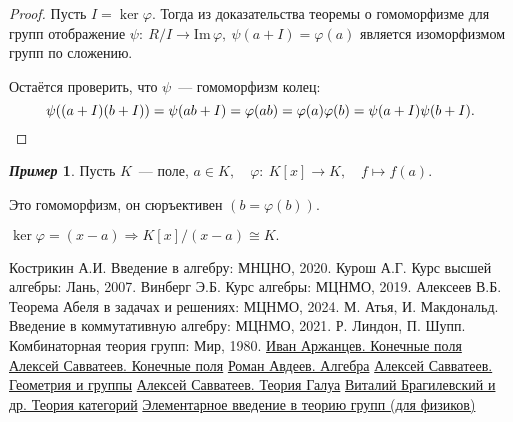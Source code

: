 \documentclass[a4paper, 14pt]{extarticle}
\newcommand{\n}{\par}
\newcommand{\im}{\mathrm{Im} \,}
\renewcommand{\phi}{\varphi}
\theoremstyle{definition}
\newtheorem*{exmpl*}{\textit{Пример}}
\theoremstyle{plain}
\numberwithin{theorem}{section}
\numberwithin{definition}{section}
\numberwithin{statement}{section}
\numberwithin{lemma}{section}
\numberwithin{consequence}{section}
\begin{document}
	\begin{proof}
		Пусть ${I = \ker \phi.}$ Тогда из доказательства теоремы о гомоморфизме для групп отображение ${\psi{:} \ R/I \rightarrow \im \phi, \ \psi(a + I) = \phi(a)}$ является изоморфизмом групп по сложению.\n
		Остаётся проверить, что $\psi$~--- гомоморфизм колец:
		\begin{equation*}
			\psi((a + I)(b + I)) = \psi(ab + I) = \phi(ab) = \phi(a)\phi(b) = \psi(a + I)\psi(b + I). \qedhere
		\end{equation*}
	\end{proof}
	\begin{exmpl*}
		Пусть $K$~--- поле, ${a \in K, \quad \phi{:} \ K[x] \rightarrow K, \quad f \mapsto f(a).}$ \n
		Это гомоморфизм, он сюръективен ${(b = \phi(b)).}$ \n
		$\ker \phi = (x - a) \Longrightarrow K[x]/(x - a) \cong K.$
	\end{exmpl*}
	\newpage
	\begin{thebibliography}{99}
		 Кострикин А.И. Введение в алгебру: МНЦНО, 2020.
		 Курош А.Г. Курс высшей алгебры: Лань, 2007.
		 Винберг Э.Б. Курс алгебры: МЦНМО, 2019.
		 Алексеев В.Б. Теорема Абеля в задачах и решениях: МЦНМО, 2024.
		 М. Атья, И. Макдональд. Введение в коммутативную алгебру: МЦНМО, 2021.
		 Р. Линдон, П. Шупп. Комбинаторная теория групп: Мир, 1980.
		 \href{https://www.youtube.com/watch?v=9PTiaQODKiA}{Иван Аржанцев. Конечные поля}
		 \href{https://youtube.com/playlist?list=PLH3NNipqeM1vcHnP4czWemq5DyBw9MXxn&si=UFBR6POWzySgFqPt}{Алексей Савватеев. Конечные поля}
		 \href{https://youtube.com/playlist?list=PLEwK9wdS5g0pxQ2ThGS3ObFwm4h1Ll0Kr&si=AM33kfEJxKFqNR-k}{Роман Авдеев. Алгебра}
		 \href{https://youtube.com/playlist?list=PLlx2izuC9gjgZsBALx2ZF7IMGoNl07A9l&si=9X5Oosl5a53UTlTb}{Алексей Савватеев. Геометрия и группы}
		 \href{https://youtube.com/playlist?list=PLgEpoT7yAl9VWebUfw4uOlut1ZaoFjFcb&si=yM6DjTk5Cenofg5U}{Алексей Савватеев. Теория Галуа}
		 \href{https://youtube.com/playlist?list=PLvPsfYrGz3wsX3Z5KuuEVYhijDxhKCDDD&si=eh_MI9GO0mYzxZMU}{Виталий Брагилевский и др. Теория категорий}
		 \href{https://youtube.com/playlist?list=PLnbH8YQPwKblIpRi0ARO2VadnMwntvF51&si=qXQx9-xB7_arfxB8}{Элементарное введение в теорию групп (для физиков)}
	\end{thebibliography}
\end{document}
